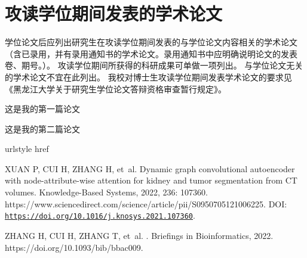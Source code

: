 
\section*{攻读学位期间发表的学术论文}

\renewcommand\refname{}

学位论文后应列出研究生在攻读学位期间发表的与学位论文内容相关的学术论文
（含已录用，并有录用通知书的学术论文。录用通知书中应明确说明论文的发表卷、期号。）。
攻读学位期间所获得的科研成果可单做一项列出。
与学位论文无关的学术论文不宜在此列出。
我校对博士生攻读学位期间发表学术论文的要求见《黑龙江大学关于研究生学位论文答辩资格审查暂行规定》。 

这是我的第一篇论文\cite{xuan_dynamic_2022}

这是我的第二篇论文\cite{10.1093/bib/bbac009}

\begin{thebibliography}{2}
    \providecommand{\natexlab}[1]{#1}
    \providecommand{\url}[1]{#1}
    \expandafter\ifx\csname urlstyle\endcsname\relax\else
      \fi
    \expandafter\ifx\csname href\endcsname\relax
      \DeclareUrlCommand{}
      \def\eprint#1#2{#2}
    \else
      \def\doi#1{\href{https://doi.org/#1}{\nolinkurl{#1}}}
      \let\eprint\href
    \fi
    
    XUAN P, CUI H, ZHANG H, et~al.
    \newblock Dynamic graph convolutional autoencoder with node-attribute-wise
      attention for kidney and tumor segmentation from {CT}
      volumes\allowbreak[J/OL].
    \newblock Knowledge-Based Systems, 2022, 236: 107360.
    \newblock
      \url{https://www.sciencedirect.com/science/article/pii/S0950705121006225}.
    \newblock DOI: \doi{https://doi.org/10.1016/j.knosys.2021.107360}.
    
    ZHANG H, CUI H, ZHANG T, et~al.
    \allowbreak[J/OL].
    \newblock Briefings in Bioinformatics, 2022.
    \newblock \url{https://doi.org/10.1093/bib/bbac009}.
    
    \end{thebibliography}